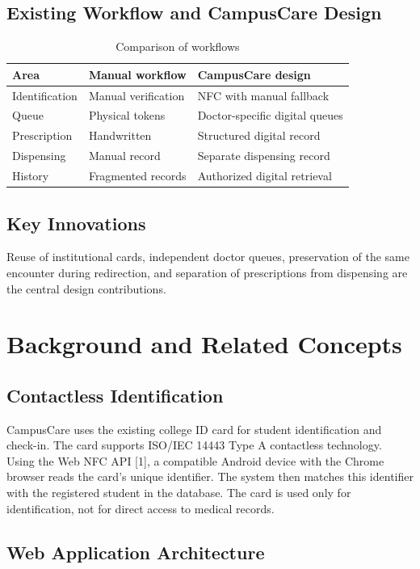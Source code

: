 \documentclass[a4paper,oneside,openany]{tietreport}
\begin{document}
\section{Existing Workflow and CampusCare Design}
\begin{table}[!htbp]\centering\small
\caption{Comparison of workflows}
\begin{tabularx}{\linewidth}{@{}YYY@{}}\toprule
\textbf{Area} & \textbf{Manual workflow} & \textbf{CampusCare design}\\\midrule
Identification & Manual verification & NFC with manual fallback\\
Queue & Physical tokens & Doctor-specific digital queues\\
Prescription & Handwritten & Structured digital record\\
Dispensing & Manual record & Separate dispensing record\\
History & Fragmented records & Authorized digital retrieval\\
\bottomrule\end{tabularx}\end{table}
\section{Key Innovations}
Reuse of institutional cards, independent doctor queues, preservation of the same encounter during redirection, and separation of prescriptions from dispensing are the central design contributions.

\chapter{Background and Related Concepts}

\section{Contactless Identification}

CampusCare uses the existing college ID card for student
identification and check-in. The card supports ISO/IEC 14443
Type A contactless technology. Using the Web NFC API [1],
a compatible Android device with the Chrome browser reads
the card's unique identifier. The system then matches this
identifier with the registered student in the database.
The card is used only for identification, not for direct
access to medical records.

\section{Web Application Architecture}
\end{document}
